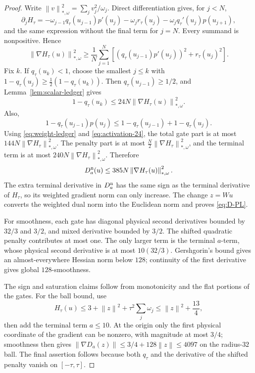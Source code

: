 \documentclass[11pt,a4paper]{article}
\newcommand{\norm}[1]{\left\lVert #1\right\rVert}
\theoremstyle{definition}
\theoremstyle{remark}
\numberwithin{equation}{section}
\begin{document}
\begin{proof}
Write $\norm v_{*,\omega}^2=\sum_jv_j^2/\omega_j$.  Direct differentiation gives, for $j<N$,
\[
 \partial_jH_\tau
 =-\omega_{j-1}q_\tau(u_{j-1})p'(u_j)
  -\omega_jr_\tau(u_j)
  -\omega_jq_\tau'(u_j)p(u_{j+1}),
\]
and the same expression without the final term for $j=N$.  Every summand is nonpositive.  Hence
\begin{equation}
 \norm{\nabla H_\tau(u)}_{*,\omega}^2
 \ge\frac1N\sum_{j=1}^N
 \left[(q_\tau(u_{j-1})p'(u_j))^2+r_\tau(u_j)^2\right].
 \label{eq:H-grad-lower}
\end{equation}
Fix $k$.  If $q_\tau(u_k)<1$, choose the smallest $j\le k$ with
$1-q_\tau(u_j)\ge\tfrac12(1-q_\tau(u_k))$.  Then $q_\tau(u_{j-1})\ge1/2$, and Lemma~\ref{lem:scalar-ledger} gives
\begin{equation}
 1-q_\tau(u_k)
 \le24N\norm{\nabla H_\tau(u)}_{*,\omega}^2.
 \label{eq:activation-24}
\end{equation}
Also,
\[
 1-q_\tau(u_{j-1})p(u_j)
 \le1-q_\tau(u_{j-1})+1-q_\tau(u_j).
\]
Using \eqref{eq:weight-ledger} and \eqref{eq:activation-24}, the total gate part is at most
$144N\norm{\nabla H_\tau}_{*,\omega}^2$.  The penalty part is at most
$\tfrac N2\norm{\nabla H_\tau}_{*,\omega}^2$, and the terminal term is at most
$240N\norm{\nabla H_\tau}_{*,\omega}^2$.  Therefore
\[
 D_a^{\rm n}(u)
 \le385N\norm{\nabla H_\tau(u)}_{*,\omega}^2.
\]
The extra terminal derivative in $D_a^{\rm n}$ has the same sign as the terminal derivative of $H_\tau$, so its weighted gradient norm can only increase.  The change $z=Wu$ converts the weighted dual norm into the Euclidean norm and proves \eqref{eq:D-PL}.

For smoothness, each gate has diagonal physical second derivatives bounded by
$32/3$ and $3/2$, and mixed derivative bounded by $3/2$.  The shifted quadratic penalty contributes at most one.  The only larger term is the terminal $a$-term, whose physical second derivative is at most $10(32/3)$.  Gershgorin's bound gives an almost-everywhere Hessian norm below $128$; continuity of the first derivative gives global $128$-smoothness.

The sign and saturation claims follow from monotonicity and the flat portions of the gates.  For the ball bound, use
\[
 H_\tau(u)\le3+\norm z^2+\tau^2\sum_j\omega_j
 \le\norm z^2+\frac{13}{4},
\]
then add the terminal term $a\le10$.  At the origin only the first physical coordinate of the gradient can be nonzero, with magnitude at most $3/4$; smoothness then gives
$\norm{\nabla D_a(z)}\le3/4+128\norm z\le4097$ on the radius-$32$ ball.  The final assertion follows because both $q_\tau$ and the derivative of the shifted penalty vanish on $[-\tau,\tau]$.
\end{proof}
\end{document}
